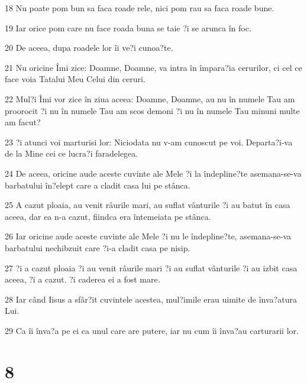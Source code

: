 \par 18 Nu poate pom bun sa faca roade rele, nici pom rau sa faca roade bune.
\par 19 Iar orice pom care nu face roada buna se taie ?i se arunca în foc.
\par 20 De aceea, dupa roadele lor îi ve?i cunoa?te.
\par 21 Nu oricine Îmi zice: Doamne, Doamne, va intra în împara?ia cerurilor, ci cel ce face voia Tatalui Meu Celui din ceruri.
\par 22 Mul?i Îmi vor zice în ziua aceea: Doamne, Doamne, au nu în numele Tau am proorocit ?i nu în numele Tau am scos demoni ?i nu în numele Tau minuni multe am facut?
\par 23 ?i atunci voi marturisi lor: Niciodata nu v-am cunoscut pe voi. Departa?i-va de la Mine cei ce lucra?i faradelegea.
\par 24 De aceea, oricine aude aceste cuvinte ale Mele ?i la îndepline?te asemana-se-va barbatului în?elept care a cladit casa lui pe stânca.
\par 25 A cazut ploaia, au venit râurile mari, au suflat vânturile ?i au batut în casa aceea, dar ea n-a cazut, fiindca era întemeiata pe stânca.
\par 26 Iar oricine aude aceste cuvinte ale Mele ?i nu le îndepline?te, asemana-se-va barbatului nechibzuit care ?i-a cladit casa pe nisip.
\par 27 ?i a cazut ploaia ?i au venit râurile mari ?i au suflat vânturile ?i au izbit casa aceea, ?i a cazut. ?i caderea ei a fost mare.
\par 28 Iar când Iisus a sfâr?it cuvintele acestea, mul?imile erau uimite de înva?atura Lui.
\par 29 Ca îi înva?a pe ei ca unul care are putere, iar nu cum îi înva?au carturarii lor.

\chapter{8}

